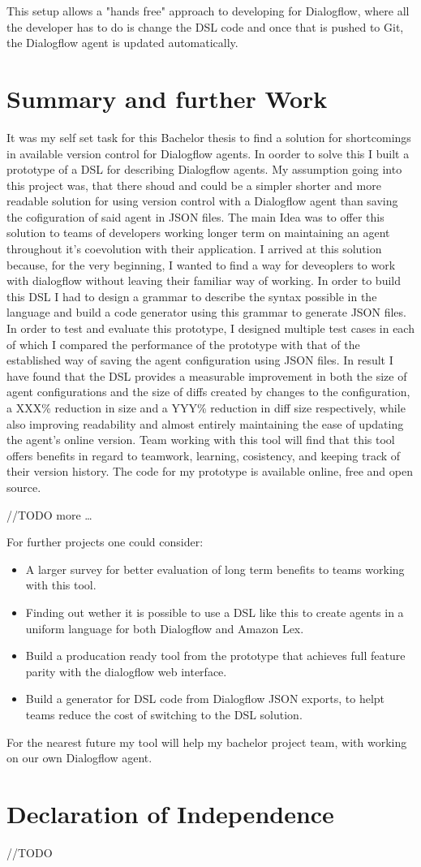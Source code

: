 This setup allows a "hands free" approach to developing for Dialogflow, where all the developer has to do is change the DSL code and once that is pushed to Git, the Dialogflow agent is updated automatically.


\chapter{Summary and further Work}

It was my self set task for this Bachelor thesis to find a solution for shortcomings in available version control for Dialogflow agents. In oorder to solve this I built a prototype of a DSL for describing Dialogflow agents.
My assumption going into this project was, that there shoud and could be a simpler shorter and more readable solution for using version control with a Dialogflow agent than saving the cofiguration of said agent in JSON files.
The main Idea was to offer this solution to teams of developers working longer term on maintaining an agent throughout it's coevolution with their application.
I arrived at this solution because, for the very beginning, I wanted to find a way for deveoplers to work with dialogflow without leaving their familiar way of working.
In order to build this DSL I had to design a grammar to describe the syntax possible in the language and build a code generator using this grammar to generate JSON files.
In order to test and evaluate this prototype, I designed multiple test cases in each of which I compared the performance of the prototype with that of the established way of saving the agent configuration using JSON files.
In result I have found that the DSL provides a measurable improvement in both the size of agent configurations and the size of diffs created by changes to the configuration, a XXX\% reduction in size and a YYY\% reduction in diff size respectively, while also improving readability and almost entirely maintaining the ease of updating the agent's online version.
Team working with this tool will find that this tool offers benefits in regard to teamwork, learning, cosistency, and keeping track of their version history.
The code for my prototype is available online, free and open source.

//TODO more
\dots


For further projects one could consider:
\begin{itemize}
    \item A larger survey for better evaluation of long term benefits to teams working with this tool.
    \item Finding out wether it is possible to use a DSL like this to create agents in a uniform language for both Dialogflow and Amazon Lex.
    \item Build a producation ready tool from the prototype that achieves full feature parity with the dialogflow web interface.
    \item Build a generator for DSL code from Dialogflow JSON exports, to helpt teams reduce the cost of switching to the DSL solution.
\end{itemize}

For the nearest future my tool will help my bachelor project team, with working on our own Dialogflow agent.


\chapter{Declaration of Independence}
//TODO
